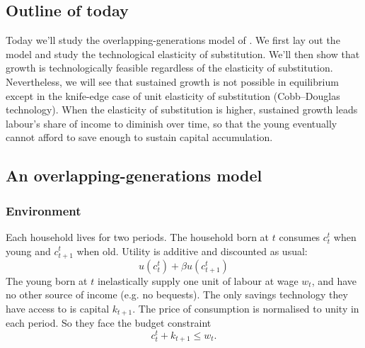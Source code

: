 \documentclass[11pt,letterpaper,reqno,oneside]{article}
\begin{document}
\subsection{Outline of today}
\label{sec:09Nov2015:outline_of_today}

Today we'll study the overlapping-generations model of \textcite[][sec. 7]{JonesManuelli1997}. We first lay out the model and study the technological elasticity of substitution. We'll then show that growth is technologically feasible regardless of the elasticity of substitution. Nevertheless, we will see that sustained growth is not possible in equilibrium except in the knife-edge case of unit elasticity of substitution (Cobb--Douglas technology). When the elasticity of substitution is higher, sustained growth leads labour's share of income to diminish over time, so that the young eventually cannot afford to save enough to sustain capital accumulation.



\subsection{An overlapping-generations model}
\label{sec:09Nov2015:olg}


\subsubsection{Environment}
\label{sec:09Nov2015:olg:environment}

Each household lives for two periods. The household born at $t$ consumes $c^t_t$ when young and $c^t_{t+1}$ when old. Utility is additive and discounted as usual:
%
\begin{equation*}
	u\left( c^t_t \right) + \beta u\left( c^t_{t+1} \right) 
\end{equation*}
%
The young born at $t$ inelastically supply one unit of labour at wage $w_t$, and have no other source of income (e.g. no bequests). The only savings technology they have access to is capital $k_{t+1}$. The price of consumption is normalised to unity in each period. So they face the budget constraint
%
\begin{equation*}
	c^t_t + k_{t+1} \leq w_t .
\end{equation*}
\end{document}
